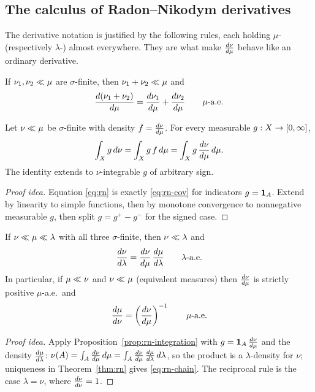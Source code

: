 \subsection{The calculus of Radon--Nikodym derivatives}

The derivative notation is justified by the following rules, each holding
$\mu$- (respectively $\lambda$-) almost everywhere. They are what make
$\frac{d \nu}{d \mu}$ behave like an ordinary derivative.

\begin{proposition}[Linearity]
\label{prop:rn-linear}
If $\nu_1, \nu_2 \ll \mu$ are $\sigma$-finite, then
$\nu_1 + \nu_2 \ll \mu$ and
\begin{equation}
  \frac{d (\nu_1 + \nu_2)}{d \mu} = \frac{d \nu_1}{d \mu} + \frac{d \nu_2}{d \mu}
  \qquad \mu\text{-a.e.}
\end{equation}
\end{proposition}

\begin{proposition}
\label{prop:rn-integration}
Let $\nu \ll \mu$ be $\sigma$-finite with density $f = \frac{d \nu}{d \mu}$. For
every measurable $g : X \to [0, \infty]$,
\begin{equation}
  \int_X g \, d\nu = \int_X g \, f \, d\mu
  = \int_X g \, \frac{d \nu}{d \mu} \, d\mu.
  \label{eq:rn-cov}
\end{equation}
The identity extends to $\nu$-integrable $g$ of arbitrary sign.
\end{proposition}

\begin{proof}[Proof idea]
Equation \eqref{eq:rn} is exactly \eqref{eq:rn-cov} for indicators
$g = \mathbf{1}_A$. Extend by linearity to simple functions, then by monotone
convergence to nonnegative measurable $g$, then split $g = g^+ - g^-$ for the
signed case.
\end{proof}

\begin{proposition}
\label{prop:rn-chain}
If $\nu \ll \mu \ll \lambda$ with all three $\sigma$-finite, then
$\nu \ll \lambda$ and
\begin{equation}
  \frac{d \nu}{d \lambda} = \frac{d \nu}{d \mu} \, \frac{d \mu}{d \lambda}
  \qquad \lambda\text{-a.e.}
  \label{eq:rn-chain}
\end{equation}
In particular, if $\mu \ll \nu$ and $\nu \ll \mu$ (equivalent
measures) then $\frac{d \nu}{d \mu}$ is strictly positive $\mu$-a.e.\ and
\begin{equation}
  \frac{d \mu}{d \nu} = \left( \frac{d \nu}{d \mu} \right)^{-1}
  \qquad \mu\text{-a.e.}
\end{equation}
\end{proposition}

\begin{proof}[Proof idea]
Apply Proposition~\ref{prop:rn-integration} with $g = \mathbf{1}_A \, \frac{d \nu}{d \mu}$
and the density $\frac{d \mu}{d \lambda}$:
$\nu(A) = \int_A \frac{d \nu}{d \mu}\,d\mu = \int_A \frac{d \nu}{d \mu}\,\frac{d \mu}{d \lambda}\,
d\lambda$, so the product is a $\lambda$-density for $\nu$; uniqueness in
Theorem~\ref{thm:rn} gives \eqref{eq:rn-chain}. The reciprocal rule is the case
$\lambda = \nu$, where $\frac{d \nu}{d \nu} = 1$.
\end{proof}
